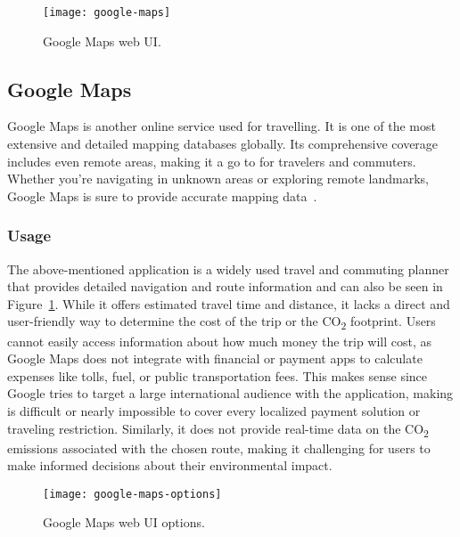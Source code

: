 \begin{figure}
    \centering
    \texttt{[image: google-maps]}
    \caption{Google Maps web UI.}
    \label{fig:figure6}
\end{figure}

\subsection{Google Maps}\label{subsec:google-maps}

Google Maps is another online service used for travelling.
It is one of the most extensive and detailed mapping databases globally.
Its comprehensive coverage includes even remote areas, making it a go to for travelers and commuters.
Whether you're navigating in unknown areas or exploring remote landmarks, Google Maps is sure to provide accurate
mapping data~\cite{googlemaps2023}.

\subsubsection{Usage}

The above-mentioned application is a widely used travel and commuting planner that provides detailed navigation and
route information and can also be seen in Figure~\ref{fig:figure6}.
While it offers estimated travel time and distance, it lacks a direct and user-friendly way to determine the cost of the
trip or the \unit{CO_{2}} footprint.
Users cannot easily access information about how much money the trip will cost, as Google Maps does not integrate with
financial or payment apps to calculate expenses like tolls, fuel, or public transportation fees.
This makes sense since Google tries to target a large international audience with the application, making is difficult
or nearly impossible to cover every localized payment solution or traveling restriction.
Similarly, it does not provide real-time data on the \unit{CO_{2}} emissions associated with the chosen route, making it
challenging for users to make informed decisions about their environmental impact.

\begin{wrapfigure}{l}{0.5\textwidth}
    \begin{center}
        \texttt{[image: google-maps-options]}
    \end{center}
    \caption{Google Maps web UI options.}
    \label{fig:figure7}
\end{wrapfigure}

